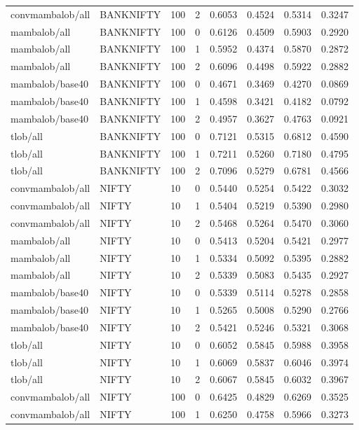 {\begin{longtable}{@{}lllrrrrr@{}}
convmambalob/all & BANKNIFTY & 100 & 2 & 0.6053 & 0.4524 & 0.5314 & 0.3247 \\
mambalob/all & BANKNIFTY & 100 & 0 & 0.6126 & 0.4509 & 0.5903 & 0.2920 \\
mambalob/all & BANKNIFTY & 100 & 1 & 0.5952 & 0.4374 & 0.5870 & 0.2872 \\
mambalob/all & BANKNIFTY & 100 & 2 & 0.6096 & 0.4498 & 0.5922 & 0.2882 \\
mambalob/base40 & BANKNIFTY & 100 & 0 & 0.4671 & 0.3469 & 0.4270 & 0.0869 \\
mambalob/base40 & BANKNIFTY & 100 & 1 & 0.4598 & 0.3421 & 0.4182 & 0.0792 \\
mambalob/base40 & BANKNIFTY & 100 & 2 & 0.4957 & 0.3627 & 0.4763 & 0.0921 \\
tlob/all & BANKNIFTY & 100 & 0 & 0.7121 & 0.5315 & 0.6812 & 0.4590 \\
tlob/all & BANKNIFTY & 100 & 1 & 0.7211 & 0.5260 & 0.7180 & 0.4795 \\
tlob/all & BANKNIFTY & 100 & 2 & 0.7096 & 0.5279 & 0.6781 & 0.4566 \\
convmambalob/all & NIFTY & 10 & 0 & 0.5440 & 0.5254 & 0.5422 & 0.3032 \\
convmambalob/all & NIFTY & 10 & 1 & 0.5404 & 0.5219 & 0.5390 & 0.2980 \\
convmambalob/all & NIFTY & 10 & 2 & 0.5468 & 0.5264 & 0.5470 & 0.3060 \\
mambalob/all & NIFTY & 10 & 0 & 0.5413 & 0.5204 & 0.5421 & 0.2977 \\
mambalob/all & NIFTY & 10 & 1 & 0.5334 & 0.5092 & 0.5395 & 0.2882 \\
mambalob/all & NIFTY & 10 & 2 & 0.5339 & 0.5083 & 0.5435 & 0.2927 \\
mambalob/base40 & NIFTY & 10 & 0 & 0.5339 & 0.5114 & 0.5278 & 0.2858 \\
mambalob/base40 & NIFTY & 10 & 1 & 0.5265 & 0.5008 & 0.5290 & 0.2766 \\
mambalob/base40 & NIFTY & 10 & 2 & 0.5421 & 0.5246 & 0.5321 & 0.3068 \\
tlob/all & NIFTY & 10 & 0 & 0.6052 & 0.5845 & 0.5988 & 0.3958 \\
tlob/all & NIFTY & 10 & 1 & 0.6069 & 0.5837 & 0.6046 & 0.3974 \\
tlob/all & NIFTY & 10 & 2 & 0.6067 & 0.5845 & 0.6032 & 0.3967 \\
convmambalob/all & NIFTY & 100 & 0 & 0.6425 & 0.4829 & 0.6269 & 0.3525 \\
convmambalob/all & NIFTY & 100 & 1 & 0.6250 & 0.4758 & 0.5966 & 0.3273 \\

\end{longtable}}
